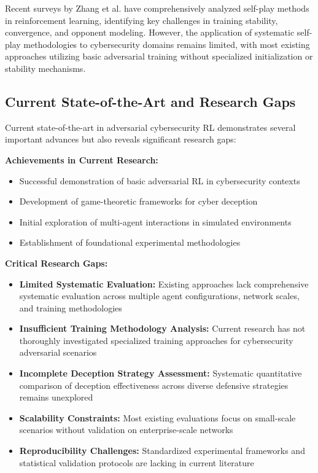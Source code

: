 \documentclass[12pt,twoside]{article}
\theoremstyle{definition}
\theoremstyle{plain}
\begin{document}
Recent surveys by Zhang et al. \cite{zhang2024survey} have comprehensively analyzed self-play methods in reinforcement learning, identifying key challenges in training stability, convergence, and opponent modeling. However, the application of systematic self-play methodologies to cybersecurity domains remains limited, with most existing approaches utilizing basic adversarial training without specialized initialization or stability mechanisms.

\subsection{Current State-of-the-Art and Research Gaps}

Current state-of-the-art in adversarial cybersecurity RL demonstrates several important advances but also reveals significant research gaps:

\textbf{Achievements in Current Research:}
\begin{itemize}
\item Successful demonstration of basic adversarial RL in cybersecurity contexts
\item Development of game-theoretic frameworks for cyber deception
\item Initial exploration of multi-agent interactions in simulated environments
\item Establishment of foundational experimental methodologies
\end{itemize}

\textbf{Critical Research Gaps:}
\begin{itemize}
\item \textbf{Limited Systematic Evaluation:} Existing approaches lack comprehensive systematic evaluation across multiple agent configurations, network scales, and training methodologies
\item \textbf{Insufficient Training Methodology Analysis:} Current research has not thoroughly investigated specialized training approaches for cybersecurity adversarial scenarios
\item \textbf{Incomplete Deception Strategy Assessment:} Systematic quantitative comparison of deception effectiveness across diverse defensive strategies remains unexplored
\item \textbf{Scalability Constraints:} Most existing evaluations focus on small-scale scenarios without validation on enterprise-scale networks
\item \textbf{Reproducibility Challenges:} Standardized experimental frameworks and statistical validation protocols are lacking in current literature
\end{itemize}
\end{document}
